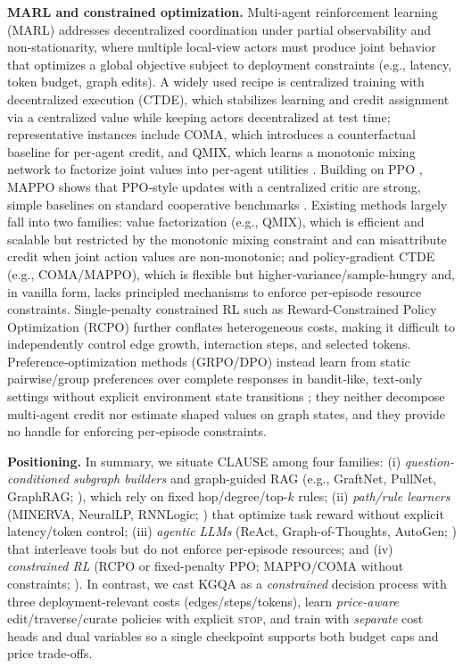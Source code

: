 \documentclass{article} %
\newcommand{\method}{\textsc{CLAUSE}\xspace}
\begin{document}
\textbf{MARL and constrained optimization.}
Multi‑agent reinforcement learning (MARL) addresses decentralized coordination under partial observability and non‑stationarity, where multiple local‑view actors must produce joint behavior that optimizes a global objective subject to deployment constraints (e.g., latency, token budget, graph edits). A widely used recipe is centralized training with decentralized execution (CTDE), which stabilizes learning and credit assignment via a centralized value while keeping actors decentralized at test time; representative instances include COMA, which introduces a counterfactual baseline for per‑agent credit, and QMIX, which learns a monotonic mixing network to factorize joint values into per‑agent utilities \citep{foerster2018coma,rashid2018qmix}. Building on PPO \citep{schulman2017ppo}, MAPPO shows that PPO‑style updates with a centralized critic are strong, simple baselines on standard cooperative benchmarks \citep{yu2022surprising}. Existing methods largely fall into two families: value factorization (e.g., QMIX), which is efficient and scalable but restricted by the monotonic mixing constraint and can misattribute credit when joint action values are non‑monotonic; and policy‑gradient CTDE (e.g., COMA/MAPPO), which is flexible but higher‑variance/sample‑hungry and, in vanilla form, lacks principled mechanisms to enforce per‑episode resource constraints. Single‑penalty constrained RL such as Reward-Constrained Policy Optimization (RCPO) \citep{tessler2018reward} further conflates heterogeneous costs, making it difficult to independently control edge growth, interaction steps, and selected tokens. Preference‑optimization methods (GRPO/DPO) instead learn from static pairwise/group preferences over complete responses in bandit‑like, text‑only settings without explicit environment state transitions \citep{rafailov2023dpo,shao2024deepseekmath}; they neither decompose multi‑agent credit nor estimate shaped values on graph states, and they provide no handle for enforcing per‑episode constraints. 


\textbf{Positioning.}
In summary, we situate \method among four families: (i) \emph{question-conditioned subgraph builders} and graph-guided RAG (e.g., GraftNet, PullNet, GraphRAG; \citep{sun2019pullnet,edge2024graphrag}), which rely on fixed hop/degree/top-$k$ rules; (ii) \emph{path/rule learners} (MINERVA, NeuralLP, RNNLogic; \citep{das2018minerva,yang2017neurallp,qu2021rnnlogic}) that optimize task reward without explicit latency/token control; (iii) \emph{agentic LLMs} (ReAct, Graph-of-Thoughts, AutoGen;
\citep{yao2023react,besta2023graphofthoughts,wu2023autogen}) that interleave tools but do not enforce per-episode resources; and (iv) \emph{constrained RL} (RCPO or fixed-penalty PPO; MAPPO/COMA without constraints; \citep{tessler2018reward,schulman2017ppo,yu2022surprising,foerster2018coma}). In contrast, we cast KGQA as a \emph{constrained} decision process with three deployment-relevant costs (edges/steps/tokens), learn \emph{price-aware} edit/traverse/curate policies with explicit \textsc{stop}, and train with \emph{separate} cost heads and dual variables so a single checkpoint supports both budget caps and price trade-offs.
\end{document}
